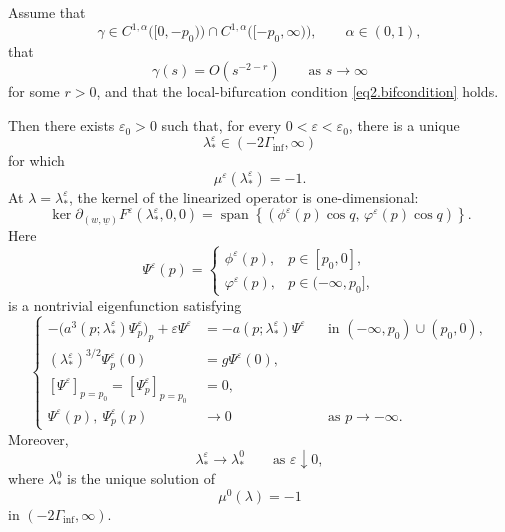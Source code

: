\documentclass[10pt,a4paper]{amsart}
\begin{document}
\begin{lemma}
\label{lem4.3}
Assume that
\[
\gamma\in
C^{1,\alpha}\bigl([0,-p_0)\bigr)
\cap
C^{1,\alpha}\bigl([-p_0,\infty)\bigr),
\qquad
\alpha\in(0,1),
\]
that
\[
\gamma(s)=O(s^{-2-r})
\qquad\text{as }s\to\infty
\]
for some $r>0$, and that the local-bifurcation condition \eqref{eq2.bifcondition} holds.

Then there exists $\varepsilon_0>0$ such that, for every
$0<\varepsilon<\varepsilon_0$, there is a unique
\[
\lambda_*^\varepsilon\in(-2\Gamma_{\inf},\infty)
\]
for which
\begin{equation}
\label{eq:crossing}
\mu^\varepsilon(\lambda_*^\varepsilon)=-1.
\end{equation}
At $\lambda=\lambda_*^\varepsilon$, the kernel of the linearized operator is
one-dimensional:
\begin{equation}
\label{eq:kernel-formula}
\ker
\partial_{(w,\underline w)}
F^\varepsilon(\lambda_*^\varepsilon,0,0)
=
\operatorname{span}
\left\{
\left(
\phi^\varepsilon(p)\cos q,\,
\varphi^\varepsilon(p)\cos q
\right)
\right\}.
\end{equation}
Here
\[
\Psi^\varepsilon(p)
=
\begin{cases}
\phi^\varepsilon(p),&p\in[p_0,0],\\
\varphi^\varepsilon(p),&p\in(-\infty,p_0],
\end{cases}
\]
is a nontrivial eigenfunction satisfying
\begin{equation}
\label{eq:one-dimensional-eigenproblem}
\left\{
\begin{aligned}
-\bigl(a^3(p;\lambda_*^\varepsilon)\Psi_p^\varepsilon\bigr)_p
+\varepsilon\Psi^\varepsilon
&=
-a(p;\lambda_*^\varepsilon)\Psi^\varepsilon
&&\text{in }(-\infty,p_0)\cup(p_0,0),\\
(\lambda_*^\varepsilon)^{3/2}\Psi_p^\varepsilon(0)
&=g\Psi^\varepsilon(0),\\
[\Psi^\varepsilon]_{p=p_0}
=
[\Psi_p^\varepsilon]_{p=p_0}
&=0,\\
\Psi^\varepsilon(p),\ \Psi_p^\varepsilon(p)
&\longrightarrow0
&&\text{as }p\to-\infty.
\end{aligned}
\right.
\end{equation}
Moreover,
\begin{equation}
\label{eq:root-convergence}
\lambda_*^\varepsilon\longrightarrow\lambda_*^0
\qquad\text{as }\varepsilon\downarrow0,
\end{equation}
where $\lambda_*^0$ is the unique solution of
\[
\mu^0(\lambda)=-1
\]
in $(-2\Gamma_{\inf},\infty)$.
\end{lemma}
\end{document}
